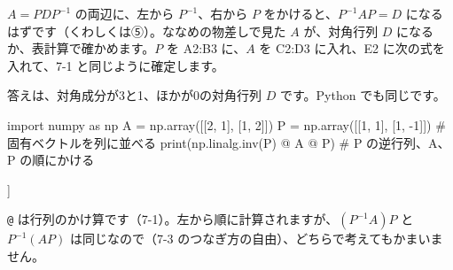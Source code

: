 
\label{bk:7-9:keisan}$A=PDP^{-1}$ の両辺に、左から $P^{-1}$、右から $P$ をかけると、$P^{-1}AP=D$ になるはずです（くわしくは⑤）。ななめの物差しで見た $A$ が、対角行列 $D$ になるか、表計算で確かめます。$P$ を A2:B3 に、$A$ を C2:D3 に入れ、E2 に次の式を入れて、7-1 と同じように確定します。
\begin{bkcenter}
\par\vspace{1mm}
\end{bkcenter}

\noindent 答えは、対角成分が3と1、ほかが0の対角行列 $D$ です。Python でも同じです。\par{}
\begin{bkcode}[Python]
import numpy as np
A = np.array([[2, 1],
              [1, 2]])
P = np.array([[1, 1],
              [1, -1]])            \# 固有ベクトルを列に並べる
print(np.linalg.inv(P) @ A @ P)   \# P の逆行列、A、P の順にかける
\end{bkcode}
\begin{bkcodeout}[実行結果]
[[3. 0.]
 [0. 1.]]
\end{bkcodeout}
\texttt{@} は行列のかけ算です（7-1）。左から順に計算されますが、$(P^{-1}A)P$ と $P^{-1}(AP)$ は同じなので（7-3 のつなぎ方の自由）、どちらで考えてもかまいません。

